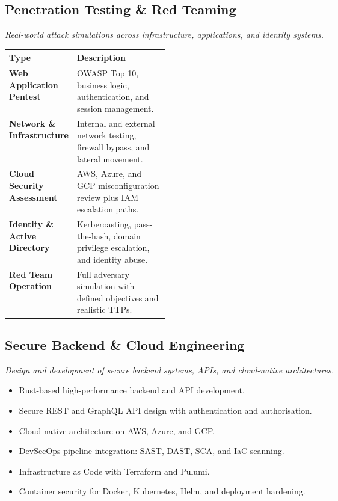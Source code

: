 \documentclass[11pt,a4paper]{article}
\begin{document}
\subsection{Penetration Testing \& Red Teaming}
\begin{redbar}\textit{Real-world attack simulations across infrastructure, applications, and identity systems.}\end{redbar}
\begin{tabularx}{\linewidth}{@{}>{\bfseries}p{0.31\linewidth}X@{}}
\toprule
Type & Description \\
\midrule
Web Application Pentest & OWASP Top 10, business logic, authentication, and session management. \\
Network \& Infrastructure & Internal and external network testing, firewall bypass, and lateral movement. \\
Cloud Security Assessment & AWS, Azure, and GCP misconfiguration review plus IAM escalation paths. \\
Identity \& Active Directory & Kerberoasting, pass-the-hash, domain privilege escalation, and identity abuse. \\
Red Team Operation & Full adversary simulation with defined objectives and realistic TTPs. \\
\bottomrule
\end{tabularx}

\subsection{Secure Backend \& Cloud Engineering}
\begin{redbar}\textit{Design and development of secure backend systems, APIs, and cloud-native architectures.}\end{redbar}
\begin{itemize}
  \item Rust-based high-performance backend and API development.
  \item Secure REST and GraphQL API design with authentication and authorisation.
  \item Cloud-native architecture on AWS, Azure, and GCP.
  \item DevSecOps pipeline integration: SAST, DAST, SCA, and IaC scanning.
  \item Infrastructure as Code with Terraform and Pulumi.
  \item Container security for Docker, Kubernetes, Helm, and deployment hardening.
\end{itemize}
\end{document}
